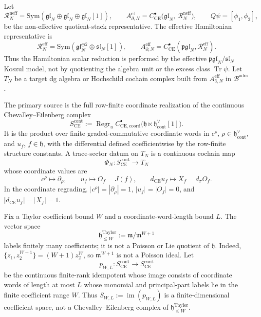 \begin{defn}\label{defn:trace-sector-reduction}
  Let
  \[
    \mathcal R_N^{\mathrm{neff}}
    =
    \mathrm{Sym}(\mathfrak{gl}_N\oplus\mathfrak{gl}_N
                 \oplus\mathfrak{gl}_N[1]),
    \qquad
    A^{\mathrm{cl}}_{\partial,N}
    =
    C^\bullet_{\mathrm{CE}}\bigl(\mathfrak{gl}_N,\,
       \mathcal R_N^{\mathrm{neff}}\bigr),
    \qquad Q\psi=[\phi_1,\phi_2],
  \]
  be the non-effective quotient-stack representative.  The effective
  Hamiltonian representative is
  \[
    \mathcal R_N^{\mathrm{eff}}
    =
    \mathrm{Sym}(\mathfrak{gl}_N^{\oplus2}\oplus\mathfrak{sl}_N[1]),
    \qquad
    A^{\mathrm{eff}}_{\partial,N}
    =
    C^\bullet_{\mathrm{CE}}
      (\mathfrak{pgl}_N,\mathcal R_N^{\mathrm{eff}}).
  \]
  Thus the Hamiltonian scalar reduction is performed by the effective
  \(\mathfrak{pgl}_N/\mathfrak{sl}_N\) Koszul model, not by quotienting
  the algebra unit or the excess class \(\operatorname{Tr}\psi\).
  Let \(T_N\) be a target dg algebra or Hochschild cochain complex
  built from \(A^{\mathrm{eff}}_{\partial,N}\) in
  \(\mathcal B^{\mathrm{adm}}\).

  The primary source is the full row-finite coordinate realization of
  the continuous Chevalley--Eilenberg complex
  \[
    S_{\mathrm{CE}}^{\mathrm{cont}}
    :=
    \operatorname{Regr}_u
    C^\bullet_{\mathrm{CE},\mathrm{coord}}
      \bigl(\mathfrak h\ltimes
        \mathfrak h^\vee_{\mathrm{cont}}[1]\bigr).
  \]
  It is the product over finite graded-commutative coordinate words in
  \(c^\rho\), \(\rho\in\mathfrak h^\vee_{\mathrm{cont}}\), and
  \(u_f\), \(f\in\mathfrak h\), with the differential defined
  coefficientwise by the row-finite structure constants.  A
  trace-sector datum on \(T_N\) is a continuous cochain map
  \[
    \Phi_N\colon S_{\mathrm{CE}}^{\mathrm{cont}}\longrightarrow T_N
  \]
  whose coordinate values are
  \[
    c^\rho\longmapsto\partial_\rho,
    \qquad
    u_f\longmapsto O_f=J(f),
    \qquad
    d_{\mathrm{CE}}u_f\longmapsto
      X_f=d_\pi O_f.
  \]
  In the coordinate regrading,
  \(|c^\rho|=|\partial_\rho|=1\),
  \(|u_f|=|O_f|=0\), and
  \(|d_{\mathrm{CE}}u_f|=|X_f|=1\).

  Fix a Taylor coefficient bound \(W\) and a coordinate-word-length
  bound \(L\).  The vector space
  \[
    \mathfrak h^{\mathrm{Taylor}}_{\leq W}
    :=\mathfrak m/\mathfrak m^{W+1}
  \]
  labels finitely many coefficients; it is not a Poisson or Lie
  quotient of \(\mathfrak h\).  Indeed,
  \(\{z_1,z_2^{W+1}\}=(W+1)z_2^W\), so
  \(\mathfrak m^{W+1}\) is not a Poisson ideal.  Let
  \[
    p_{W,L}\colon S_{\mathrm{CE}}^{\mathrm{cont}}
      \longrightarrow S_{\mathrm{CE}}^{\mathrm{cont}}
  \]
  be the continuous finite-rank idempotent whose image consists of
  coordinate words of length at most \(L\) whose monomial and
  principal-part labels lie in the finite coefficient range \(W\).  Thus
  \(S_{W,L}:=\operatorname{im}(p_{W,L})\) is a finite-dimensional
  coefficient space, not a Chevalley--Eilenberg complex of
  \(\mathfrak h^{\mathrm{Taylor}}_{\leq W}\).


\end{defn}

